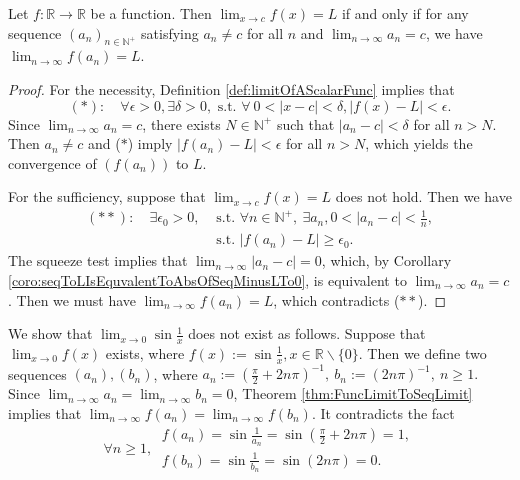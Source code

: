 \begin{thm}
  \label{thm:FuncLimitToSeqLimit}
  Let $f:\mathbb{R}\rightarrow \mathbb{R}$ be a function.
  Then $\lim_{x\rightarrow c}f(x)=L$ if and only if
  for any sequence $(a_{n})_{n\in \mathbb{N}^{+}}$ satisfying
  $a_{n}\neq c$ for all $n$ and
  $\lim_{n\rightarrow\infty}a_{n}=c$, we have
  $\lim_{n\rightarrow \infty}f(a_{n})=L$.
\end{thm}
\begin{proof}
  For the necessity, Definition \ref{def:limitOfAScalarFunc}
  implies that
  \begin{displaymath}
    (*):\quad
    \forall \epsilon>0, \exists \delta>0,\text{ s.t. }
    \forall\ 0<|x-c|<\delta, |f(x)-L|<\epsilon.
  \end{displaymath}
  Since $\lim_{n\rightarrow\infty}a_{n}=c$, there exists $N\in \mathbb{N}^{+}$
  such that $|a_{n}-c|<\delta$ for all $n>N$. Then $a_{n}\neq c$ and
  ($\ast$) imply $|f(a_{n})-L|<\epsilon$ for all $n>N$, which yields
  the convergence of $(f(a_{n}))$ to $L$.

  For the sufficiency, suppose that $\lim_{x\rightarrow c}f(x)=L$
  does not hold. Then we have
  \begin{align*}
    (**): \quad
    \exists \epsilon_{0}>0,&\text{ s.t. }
    \forall n\in \mathbb{N}^{+},\ \exists a_{n}, 0<|a_{n}-c|<\frac{1}{n},\\
    &\text{ s.t. } |f(a_{n})-L|\ge \epsilon_{0}.
  \end{align*}
  The squeeze test implies that
  $\lim_{n\rightarrow\infty}|a_{n}-c|=0$, which,
  by Corollary
  \ref{coro:seqToLIsEquvalentToAbsOfSeqMinusLTo0},
  is equivalent to
  $\lim_{n\rightarrow\infty}a_{n}=c$.
  Then we must have
  $\lim_{n\rightarrow\infty}f(a_{n})=L$,
  which contradicts ($\ast\ast$).
\end{proof}

\begin{exm}
  \label{exm:nonexistLimitForShowingEpsDelt}
  We show that $\lim_{x\rightarrow 0}\sin \frac{1}{x}$ does not exist
  as follows. Suppose that $\lim_{x\rightarrow 0}f(x)$ exists, where
  $f(x):=\sin \frac{1}{x}, x\in \mathbb{R}\backslash \{0\}.$
  Then we define two sequences $(a_{n}),(b_{n})$, where
  $a_{n}:=(\frac{\pi}{2}+2n\pi)^{-1},\
      b_{n}:=(2n\pi)^{-1},\ n\ge 1.$
  Since $\lim_{n\rightarrow\infty}a_{n}=\lim_{n\rightarrow\infty}b_{n}=0$,
  Theorem \ref{thm:FuncLimitToSeqLimit} implies
  that $\lim_{n\rightarrow\infty}f(a_{n})=\lim_{n\rightarrow\infty}f(b_{n})$.
  It contradicts the fact
  \begin{displaymath}
    \forall n\ge 1,\
    \begin{array}{l}
      f(a_{n})=\sin \frac{1}{a_{n}}=\sin(\frac{\pi}{2}+2n\pi)=1,\\
      f(b_{n})=\sin \frac{1}{b_{n}}=\sin(2n\pi)=0.
    \end{array}
  \end{displaymath}
\end{exm}

